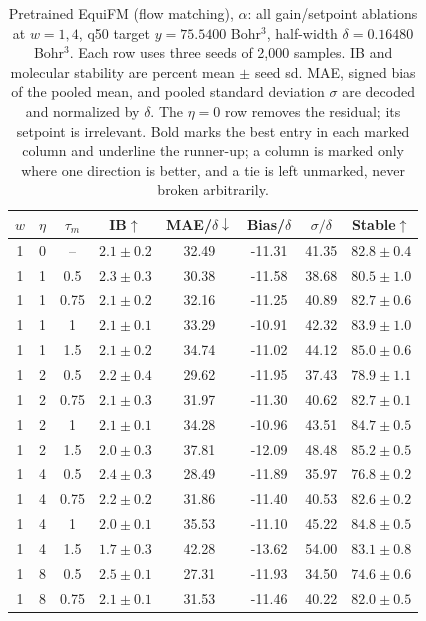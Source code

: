 \documentclass{article}
\begin{document}
\begin{table}[!htbp]
\centering\small
\caption{Pretrained EquiFM (flow matching), $\alpha$: all gain/setpoint ablations at $w=1,4$, q50 target $y=75.5400$ Bohr$^3$, half-width $\delta=0.16480$ Bohr$^3$. Each row uses three seeds of 2,000 samples. IB and molecular stability are percent mean $\pm$ seed sd. MAE, signed bias of the pooled mean, and pooled standard deviation $\sigma$ are decoded and normalized by $\delta$. The $\eta=0$ row removes the residual; its setpoint is irrelevant. Bold marks the best entry in each marked column and underline the runner-up; a column is marked only where one direction is better, and a tie is left unmarked, never broken arbitrarily.}
\label{tab:grid-equifm-alpha}
\begin{tabular}{cccccccc}
\toprule
$w$ & $\eta$ & $\tau_m$ & IB$\uparrow$ & MAE/$\delta\downarrow$ & Bias/$\delta$ & $\sigma/\delta$ & Stable$\uparrow$\\
\midrule
1 & 0 & -- & $2.1\pm0.2$ & 32.49 & -11.31 & 41.35 & $82.8\pm0.4$\\
1 & 1 & 0.5 & $2.3\pm0.3$ & 30.38 & -11.58 & 38.68 & $80.5\pm1.0$\\
1 & 1 & 0.75 & $2.1\pm0.2$ & 32.16 & -11.25 & 40.89 & $82.7\pm0.6$\\
1 & 1 & 1 & $2.1\pm0.1$ & 33.29 & -10.91 & 42.32 & $83.9\pm1.0$\\
1 & 1 & 1.5 & $2.1\pm0.2$ & 34.74 & -11.02 & 44.12 & $85.0\pm0.6$\\
1 & 2 & 0.5 & $2.2\pm0.4$ & 29.62 & -11.95 & 37.43 & $78.9\pm1.1$\\
1 & 2 & 0.75 & $2.1\pm0.3$ & 31.97 & -11.30 & 40.62 & $82.7\pm0.1$\\
1 & 2 & 1 & $2.1\pm0.1$ & 34.28 & -10.96 & 43.51 & $84.7\pm0.5$\\
1 & 2 & 1.5 & $2.0\pm0.3$ & 37.81 & -12.09 & 48.48 & $\mathbf{85.2\pm0.5}$\\
1 & 4 & 0.5 & $2.4\pm0.3$ & 28.49 & -11.89 & 35.97 & $76.8\pm0.2$\\
1 & 4 & 0.75 & $2.2\pm0.2$ & 31.86 & -11.40 & 40.53 & $82.6\pm0.2$\\
1 & 4 & 1 & $2.0\pm0.1$ & 35.53 & -11.10 & 45.22 & $84.8\pm0.5$\\
1 & 4 & 1.5 & $1.7\pm0.3$ & 42.28 & -13.62 & 54.00 & $83.1\pm0.8$\\
1 & 8 & 0.5 & $2.5\pm0.1$ & 27.31 & -11.93 & 34.50 & $74.6\pm0.6$\\
1 & 8 & 0.75 & $2.1\pm0.1$ & 31.53 & -11.46 & 40.22 & $82.0\pm0.5$\\

\end{tabular}
\end{table}
\end{document}

